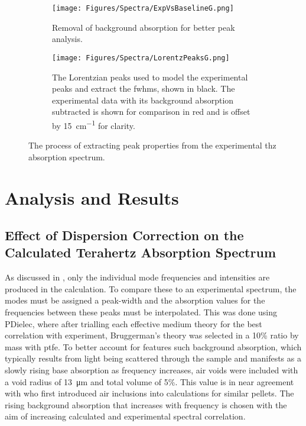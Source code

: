 \begin{figure}
\centering
\begin{subfigure}{1\textwidth}
    \centering
    \texttt{[image: Figures/Spectra/ExpVsBaselineG.png]}
    \caption{Removal of background absorption for better peak analysis.}
    \label{fig:aLM_abs_baseline}
    \vspace{5 mm}
\end{subfigure}
\begin{subfigure}{1\textwidth}
    \centering
    \texttt{[image: Figures/Spectra/LorentzPeaksG.png]}
    \caption{The Lorentzian peaks used to model the experimental peaks and extract the \acrshort{fwhm}s, shown in black. The experimental data with its background absorption subtracted is shown for comparison in red and is offset by \SI{15}{cm^{-1}} for clarity.}
    \label{fig:aLM_abs_lorentz}
\end{subfigure}
\captionsetup{font = footnotesize, justification = centering}
\caption[Extraction of Experimental Peak Widths]{The process of extracting peak properties from the experimental \acrshort{thz} absorption spectrum.}
\label{fig:peak_widths}
\end{figure}

\section{Analysis and Results}
\subsection{Effect of Dispersion Correction on the Calculated Terahertz Absorption Spectrum}
\label{subsec:ch4_spectra}
As discussed in , only the individual mode frequencies and intensities are produced in the calculation. To compare these to an experimental spectrum, the modes must be assigned a peak\nobreakdash-width and the absorption values for the frequencies between these peaks must be interpolated. This was done using PDielec, where after trialling each effective medium theory for the best correlation with experiment, Bruggerman's \DIFdelbegin \DIFdel{~}\DIFdelend \cite{Bruggeman1935} theory was selected in a 10\% ratio by mass with \acrshort{ptfe}. To better account for features such background absorption, which typically results from light being scattered through the sample and manifests as a slowly rising base absorption as frequency increases, air voids were included with a void radius of \SI{13}{\micro\metre} and total volume of 5\%. This value is in near agreement with \DIFdelbegin \DIFdel{~}\DIFdelend \cite{Parrott2009} who first introduced air inclusions into calculations for similar pellets. The rising background absorption that increases with frequency is chosen with the aim of increasing calculated and experimental spectral correlation.

